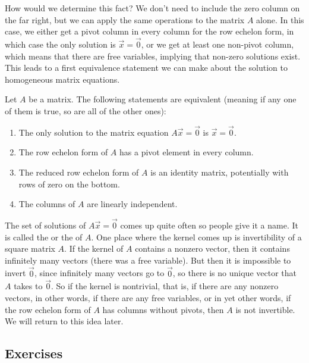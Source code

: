 How would we determine this fact? We don't need to include the zero column on the far right, but we can apply the same operations to the matrix $A$ alone. In this case, we either get a pivot column in every column for the row echelon form, in which case the only solution is $\vec{x} = \vec{0}$, or we get at least one non-pivot column, which means that there are free variables, implying that non-zero solutions exist. This leads to a first equivalence statement we can make about the solution to homogeneous matrix equations.

\begin{theorem}
Let $A$ be a matrix. The following statements are equivalent (meaning if any one of them is true, so are all of the other ones):
\begin{enumerate}
\item The only solution to the matrix equation $A\vec{x} = \vec{0}$ is $\vec{x} = \vec{0}$. 
\item The row echelon form of $A$ has a pivot element in every column.
\item The reduced row echelon form of $A$ is an identity matrix, potentially with rows of zero on the bottom.
\item The columns of $A$ are linearly independent.
\end{enumerate}
\end{theorem} 

The set of solutions of $A \vec{x} = \vec{0}$ comes up quite often
so people give it a name.  It is called the
\emph{} or the 
\emph{} of $A$.
One place where the kernel comes up is invertibility of a square matrix $A$.
If the kernel of $A$ contains a nonzero vector, then it contains
infinitely many vectors (there was a free variable).  But then it is
impossible to invert $\vec{0}$, since infinitely many vectors go to
$\vec{0}$, so there is no unique vector that $A$ takes to $\vec{0}$.
So if the kernel is nontrivial, that is, if there are any nonzero vectors,
in other words, if there are any free variables, or in yet other words,
if the row echelon form of $A$ has columns without pivots,
then $A$ is not invertible.  We will return to this idea later.


\subsection{Exercises}

